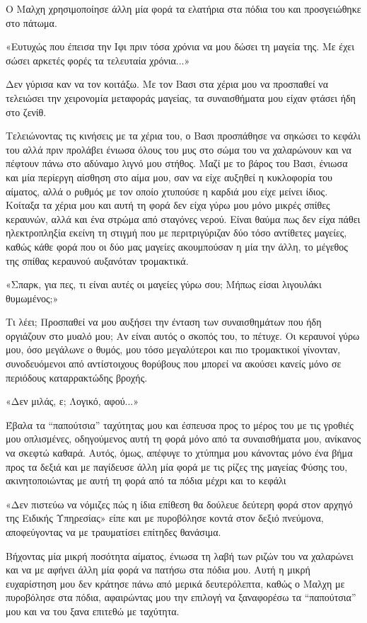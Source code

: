 \documentclass[12pt,twoside, openany]{book}
\begin{document}
Ο Μαλχη χρησιμοποίησε άλλη μία φορά τα ελατήρια στα πόδια του και προσγειώθηκε στο πάτωμα. 

«Ευτυχώς που έπεισα την Ιφι πριν τόσα χρόνια να μου δώσει τη μαγεία της. Με έχει σώσει αρκετές φορές τα τελευταία χρόνια...»

Δεν γύρισα καν να τον κοιτάξω. Με τον Βασι στα χέρια μου να προσπαθεί να τελειώσει την χειρονομία μεταφοράς μαγείας, τα συναισθήματα μου είχαν φτάσει ήδη στο ζενίθ.

Τελειώνοντας τις κινήσεις με τα χέρια του, ο Βασι προσπάθησε να σηκώσει το κεφάλι του αλλά πριν προλάβει ένιωσα όλους του μυς στο σώμα του να χαλαρώνουν και να πέφτουν πάνω στο αδύναμο λιγνό μου στήθος. Μαζί με το βάρος του Βασι, ένιωσα και μία περίεργη αίσθηση στο αίμα μου, σαν να είχε αυξηθεί η κυκλοφορία του αίματος, αλλά ο ρυθμός με τον οποίο χτυπούσε η καρδιά μου είχε μείνει ίδιος. Κοίταξα τα χέρια μου και αυτή τη φορά δεν είχα γύρω μου μόνο μικρές σπίθες κεραυνών, αλλά και ένα στρώμα από σταγόνες νερού. Είναι θαύμα πως δεν είχα πάθει ηλεκτροπληξία εκείνη τη στιγμή που με περιτριγύριζαν δύο τόσο αντίθετες μαγείες, καθώς κάθε φορά που οι δύο μας μαγείες ακουμπούσαν η μία την άλλη, το μέγεθος της σπίθας κεραυνού αυξανόταν τρομακτικά.

«Σπαρκ, για πες, τι είναι αυτές οι μαγείες γύρω σου; Μήπως είσαι λιγουλάκι θυμωμένος;»

Τι λέει; Προσπαθεί να μου αυξήσει την ένταση των συναισθημάτων που ήδη οργιάζουν στο μυαλό μου; Αν είναι αυτός ο σκοπός του, το πέτυχε. Οι κεραυνοί γύρω μου, όσο μεγάλωνε ο θυμός, μου τόσο μεγαλύτεροι και πιο τρομακτικοί γίνονταν, συνοδευόμενοι από αντίστοιχους θορύβους που μπορεί να ακούσει κανείς μόνο σε περιόδους καταρρακτώδης βροχής.

«Δεν μιλάς, ε; Λογικό, αφού...»

Έβαλα τα “παπούτσια” ταχύτητας μου και έσπευσα προς το μέρος του με τις γροθιές μου οπλισμένες, οδηγούμενος αυτή τη φορά μόνο από τα συναισθήματα μου, ανίκανος να σκεφτώ καθαρά. Αυτός, όμως, απέφυγε το χτύπημα μου κάνοντας μόνο ένα βήμα προς τα δεξιά και με παγίδευσε άλλη μία φορά με τις ρίζες της μαγείας Φύσης του, ακινητοποιώντας με αυτή τη φορά από τα πόδια μέχρι και το κεφάλι

«Δεν πιστεύω να νόμιζες πώς η ίδια επίθεση θα δούλευε δεύτερη φορά στον αρχηγό της Ειδικής Υπηρεσίας» είπε και με πυροβόλησε κοντά στον δεξιό πνεύμονα, αποφεύγοντας να με τραυματίσει επίτηδες θανάσιμα. 

Βήχοντας μία μικρή ποσότητα αίματος, ένιωσα τη λαβή των ριζών του να χαλαρώνει και να με αφήνει άλλη μία φορά να πατήσω στα πόδια μου. Αυτή η μικρή ευχαρίστηση μου δεν κράτησε πάνω από μερικά δευτερόλεπτα, καθώς ο Μαλχη με πυροβόλησε στα πόδια, αφαιρώντας μου την επιλογή να ξαναφορέσω τα “παπούτσια” μου και να του ξανα επιτεθώ με ταχύτητα.
\end{document}
